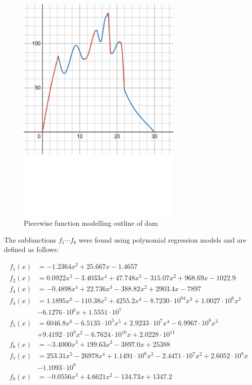 \documentclass{article}
\begin{document}
    \begin{figure}
        \centering
        \includegraphics[width = 8cm]{damFunction.pdf}
        \caption{Piecewise function modelling outline of dam}
        \label{figDamFunction}
    \end{figure}

    The subfunctions $f_1 \cdots f_8$ were found using polynomial regression models and are defined as follows:

    \begin{align*}
        f_1(x) &= -1.2364x^2 + 25.667x - 1.4657 \\
        f_2(x) &= 0.0922x^5 - 3.4033x^4 + 47.748x^3 - 315.07x^2 + 968.69x - 1022.9 \\
        f_3(x) &= -0.4898x^4 + 22.736x^3 - 388.82x^2 + 2903.4x - 7897 \\
        f_4(x) &= 1.1895x^6 - 110.38x^5 + 4255.2x^4 - 8.7230\cdot 10^04x^3 + 1.0027\cdot 10^6x^2 \\ &- 6.1276\cdot 10^6x + 1.5551\cdot 10^7 \\
        f_5(x) &= 6046.8x^6 - 6.5135 \cdot 10^5x^5 + 2.9233 \cdot 10^7x^4 - 6.9967 \cdot 10^8x^3 \\ &+ 9.4192 \cdot 10^9x^2 - 6.7624 \cdot 10^{10}x + 2.0228 \cdot 10^{11} \\
        f_6(x) &= -3.4000x^3 + 199.63x^2 - 3897.0x + 25388 \\
        f_7(x) &= 253.31x^5 - 26978x^4 + 1.1491 \cdot 10^6x^3 - 2.4471 \cdot 10^7x^2 + 2.6052 \cdot 10^8x \\ &- 1.1093 \cdot 10^9 \\
        f_8(x) &= -0.0556x^3 + 4.6621x^2 - 134.73x + 1347.2
    \end{align*}
\end{document}
